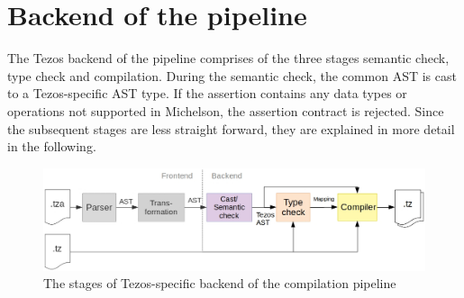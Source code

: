 \section{Backend of the pipeline}
The Tezos backend of the pipeline comprises of the three stages semantic check, type check and compilation. During the semantic check, the common AST is cast to a Tezos-specific AST type. If the assertion contains any data types or operations not supported in Michelson, the assertion contract is rejected. Since the subsequent stages are less straight forward, they are explained in more detail in the following.
\begin{figure}[h]
\includegraphics[width=\linewidth]{figures/4-offline_tezos/pipeline_backend}
\caption{The stages of Tezos-specific backend of the compilation pipeline}
\label{fig:pipeline_backend}
\end{figure}

